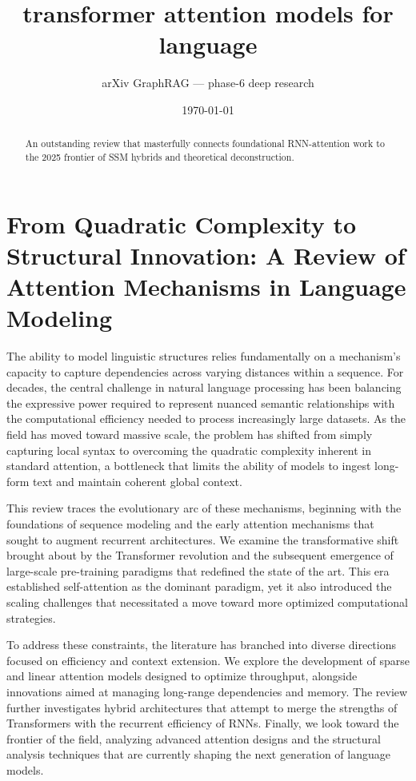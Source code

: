 \documentclass[11pt]{article}
\title{transformer attention models for language}
\author{arXiv GraphRAG --- phase-6 deep research}
\date{\today}
\begin{document}
\maketitle

\begin{abstract}
An outstanding review that masterfully connects foundational RNN-attention work to the 2025 frontier of SSM hybrids and theoretical deconstruction.
\end{abstract}

\section{From Quadratic Complexity to Structural Innovation: A Review of Attention Mechanisms in Language Modeling}

The ability to model linguistic structures relies fundamentally on a mechanism's capacity to capture dependencies across varying distances within a sequence. For decades, the central challenge in natural language processing has been balancing the expressive power required to represent nuanced semantic relationships with the computational efficiency needed to process increasingly large datasets. As the field has moved toward massive scale, the problem has shifted from simply capturing local syntax to overcoming the quadratic complexity inherent in standard attention, a bottleneck that limits the ability of models to ingest long-form text and maintain coherent global context.

This review traces the evolutionary arc of these mechanisms, beginning with the foundations of sequence modeling and the early attention mechanisms that sought to augment recurrent architectures. We examine the transformative shift brought about by the Transformer revolution and the subsequent emergence of large-scale pre-training paradigms that redefined the state of the art. This era established self-attention as the dominant paradigm, yet it also introduced the scaling challenges that necessitated a move toward more optimized computational strategies.

To address these constraints, the literature has branched into diverse directions focused on efficiency and context extension. We explore the development of sparse and linear attention models designed to optimize throughput, alongside innovations aimed at managing long-range dependencies and memory. The review further investigates hybrid architectures that attempt to merge the strengths of Transformers with the recurrent efficiency of RNNs. Finally, we look toward the frontier of the field, analyzing advanced attention designs and the structural analysis techniques that are currently shaping the next generation of language models.
\end{document}
